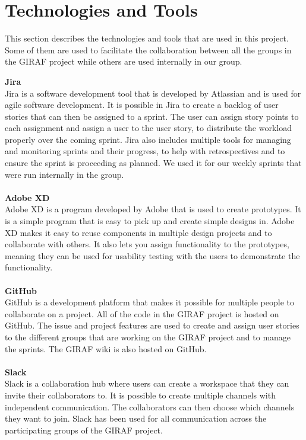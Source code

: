 \section{Technologies and Tools}
This section describes the technologies and tools that are used in this project. 
Some of them are used to facilitate the collaboration between all the groups in the GIRAF project while others are used internally in our group.

\textbf{Jira}\\
Jira is a software development tool that is developed by Atlassian and is used for agile software development.
It is possible in Jira to create a backlog of user stories that can then be assigned to a sprint. 
The user can assign story points to each assignment and assign a user to the user story, to distribute the workload properly over the coming sprint.
Jira also includes multiple tools for managing and monitoring sprints and their progress, to help with retrospectives and to ensure the sprint is proceeding as planned.
We used it for our weekly sprints that were run internally in the group.
\\\\
\textbf{Adobe XD}\\
Adobe XD is a program developed by Adobe that is used to create prototypes.
It is a simple program that is easy to pick up and create simple designs in.
Adobe XD makes it easy to reuse components in multiple design projects and to collaborate with others.
It also lets you assign functionality to the prototypes, meaning they can be used for usability testing with the users to demonstrate the functionality.
\\\\
\textbf{GitHub}\\
GitHub is a development platform that makes it possible for multiple people to collaborate on a project. 
All of the code in the GIRAF project is hosted on GitHub.
The issue and project features are used to create and assign user stories to the different groups that are working on the GIRAF project and to manage the sprints. 
The GIRAF wiki is also hosted on GitHub.
\\\\
\textbf{Slack}\\
Slack is a collaboration hub where users can create a workspace that they can invite their collaborators to.
It is possible to create multiple channels with independent communication. 
The collaborators can then choose which channels they want to join.
Slack has been used for all communication across the participating groups of the GIRAF project.
